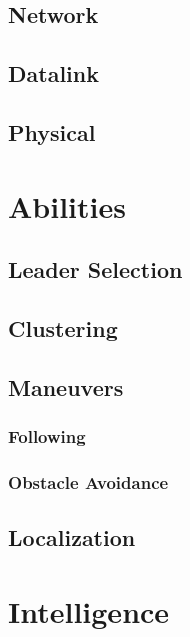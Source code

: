 \documentclass[a4paper,10pt]{article}
\theoremstyle{theorem}
\begin{document}
\subsection{Network}
\subsection{Datalink}
\subsection{Physical}

\section{Abilities}
\subsection{Leader Selection}
\subsection{Clustering}
\subsection{Maneuvers}
\subsubsection{Following}
\subsubsection{Obstacle Avoidance}
\subsection{Localization}

\section{Intelligence}
\subsection{}





\end{document}
